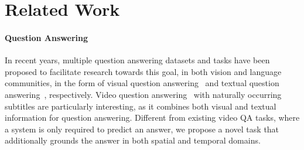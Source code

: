 \documentclass[11pt,a4paper]{article}
\begin{document}
\begin{table*}[!ht]
\centering
\small
{}
\vspace{-10pt}
\caption{Comparison of TVQA+ with other video-language datasets. TL=Temporal Localization, SL=Spatial Localization, CAP=Captioning.
}
\label{tab:dataset_comparison}
\end{table*}




\section{Related Work}\label{related}

\paragraph{Question Answering}  
In recent years, multiple question answering datasets and tasks have been proposed to facilitate research towards this goal, in both vision and language communities, in the form of visual question answering~\cite{Antol2015VQAVQ,Yu2015VisualMF,Jang2017TGIFQATS} and textual question answering~\cite{Rajpurkar2016SQuAD10,Weston2016TowardsAQ}, respectively. 
Video question answering~\cite{lei2018tvqa,Tapaswi2016MovieQAUS,Kim2017DeepStoryVS} with naturally occurring subtitles are particularly interesting, as it combines both visual and textual information for question answering. 
Different from existing video QA tasks, where a system is only required to predict an answer, we propose a novel task that additionally grounds the answer in both spatial and temporal domains. 
\end{document}
